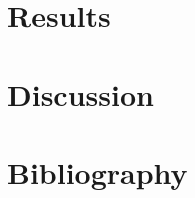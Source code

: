 \documentclass[12pt]{article}
\begin{document}
\section{Results}
\lipsum[6-7]  %

\section{Discussion}
\lipsum[8-9]  %

\section{Bibliography}
\printbibliography[heading=none]

\end{document}
